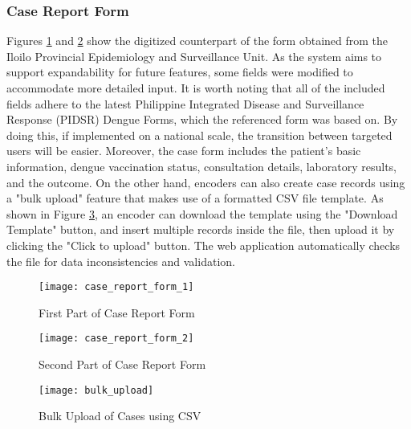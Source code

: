 \subsubsection{Case Report Form}
Figures \ref{fig:case_report_form_1} and \ref{fig:case_report_form_2} show the digitized counterpart of the form obtained from the Iloilo Provincial Epidemiology and Surveillance Unit. As the system aims to support expandability for future features, some fields were modified to accommodate more detailed input. It is worth noting that all of the included fields adhere to the latest Philippine Integrated Disease and Surveillance Response (PIDSR) Dengue Forms, which the referenced form was based on. By doing this, if implemented on a national scale, the transition between targeted users will be easier. Moreover, the case form includes the patient's basic information, dengue vaccination status, consultation details, laboratory results, and the outcome. On the other hand, encoders can also create case records using a "bulk upload" feature that makes use of a formatted CSV file template. As shown in Figure \ref{fig:bulk_upload}, an encoder can download the template using the "Download Template" button, and insert multiple records inside the file, then upload it by clicking the "Click to upload" button. The web application automatically checks the file for data inconsistencies and validation. 
\begin{figure}[H]
	\centering
	\texttt{[image: case\_report\_form\_1]}
	\caption{First Part of Case Report Form}
	\label{fig:case_report_form_1}
\end{figure}
\begin{figure}[H]
	\centering
	\texttt{[image: case\_report\_form\_2]}
	\caption{Second Part of Case Report Form}
	\label{fig:case_report_form_2}
\end{figure}
\begin{figure}[H]
	\centering
	\texttt{[image: bulk\_upload]}
	\caption{Bulk Upload of Cases using CSV}
	\label{fig:bulk_upload}
\end{figure}

